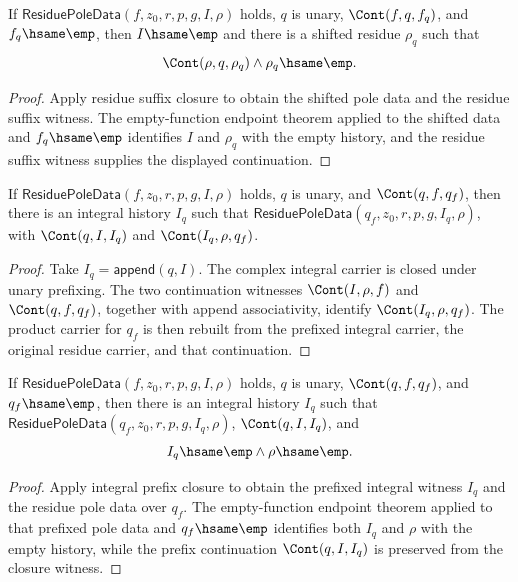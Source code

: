 \begin{theorem}
\label{thm:residue-pole-data-suffix-empty-function-endpoints}
If \(\mathsf{ResiduePoleData}(f,z_0,r,p,g,I,\rho)\) holds, \(q\) is unary,
\(\Cont(f,q,f_q)\), and \(f_q\hsame\emp\), then \(I\hsame\emp\) and there is
a shifted residue \(\rho_q\) such that
$$
\Cont(\rho,q,\rho_q)\land \rho_q\hsame\emp.
$$
\end{theorem}
\begin{proof}
Apply residue suffix closure to obtain the shifted pole data and the residue
suffix witness. The empty-function endpoint theorem applied to the shifted
data and \(f_q\hsame\emp\) identifies \(I\) and \(\rho_q\) with the empty
history, and the residue suffix witness supplies the displayed continuation.
\end{proof}

\begin{theorem}
\label{thm:residue-pole-data-integral-prefix-closure}
If \(\mathsf{ResiduePoleData}(f,z_0,r,p,g,I,\rho)\) holds, \(q\) is unary,
and \(\Cont(q,f,q_f)\), then there is an integral history \(I_q\) such that
\(\mathsf{ResiduePoleData}(q_f,z_0,r,p,g,I_q,\rho)\), with
\(\Cont(q,I,I_q)\) and \(\Cont(I_q,\rho,q_f)\).
\end{theorem}
\begin{proof}
Take \(I_q=\mathsf{append}(q,I)\). The complex integral carrier is closed under
unary prefixing. The two continuation witnesses \(\Cont(I,\rho,f)\) and
\(\Cont(q,f,q_f)\), together with append associativity, identify
\(\Cont(I_q,\rho,q_f)\). The product carrier for \(q_f\) is then rebuilt from
the prefixed integral carrier, the original residue carrier, and that
continuation.
\end{proof}

\begin{theorem}
\label{thm:residue-pole-data-integral-prefix-empty-function-endpoints}
If \(\mathsf{ResiduePoleData}(f,z_0,r,p,g,I,\rho)\) holds, \(q\) is unary,
\(\Cont(q,f,q_f)\), and \(q_f\hsame\emp\), then there is an integral history
\(I_q\) such that \(\mathsf{ResiduePoleData}(q_f,z_0,r,p,g,I_q,\rho)\),
\(\Cont(q,I,I_q)\), and
$$
I_q\hsame\emp\land \rho\hsame\emp.
$$
\end{theorem}
\begin{proof}
Apply integral prefix closure to obtain the prefixed integral witness \(I_q\)
and the residue pole data over \(q_f\). The empty-function endpoint theorem
applied to that prefixed pole data and \(q_f\hsame\emp\) identifies both
\(I_q\) and \(\rho\) with the empty history, while the prefix continuation
\(\Cont(q,I,I_q)\) is preserved from the closure witness.
\end{proof}

